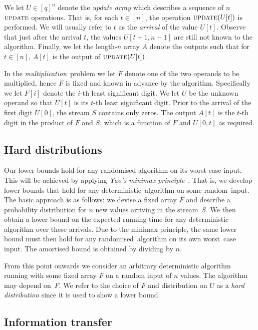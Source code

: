 \documentclass[11pt]{article}
\numberwithin{equation}{section}
\theoremstyle{definition}
\theoremstyle{plain}
\newcommand{\arrive}{\ensuremath{\textsc{update}}}
\begin{document}
We let $U\in [q]^n$ denote the \emph{update array} which describes a sequence of  $n$ $\arrive$ operations. That is, for each $t\in[n]$, the operation $\arrive(U[t])$ is performed.
We will usually refer to $t$ as the \emph{arrival} of the value $U[t]$.
Observe that just after the arrival $t$, the values $U[t+1,n-1]$ are still not known to the algorithm. Finally, we let the
%
length-$n$   %
array $A$ denote the outputs such that for $t\in [n]$, $A[t]$ is the output of $\arrive(U[t])$.

In the \emph{multiplication}~problem we let $F$ denote one of the two operands to be multiplied, hence $F$ is fixed and known in advance by the algorithm.
Specifically we let $F[i]$ denote the $i$-th least significant digit. We let $U$ be the unknown operand so that $U[t]$ is its $t$-th least significant digit. Prior to the arrival of the first digit $U[0]$, the stream $S$ contains only zeros. The output $A[t]$ is the $t$-th digit in the product of $F$ and $S$, which is a function of $F$ and $U[0,t]$ as required.

%

\subsection{Hard distributions}

Our lower bounds hold for any randomised algorithm on its worst case
input. This will be achieved by applying \emph{Yao's
	minimax principle}~\cite{Yao1977:Minimax}. That is, we develop
lower bounds that
hold for any deterministic~algorithm on some random~input. The basic approach is as follows: we devise a fixed array $F$ and describe a probability
distribution for $n$ new values arriving in the stream~$S$.
We then obtain a lower bound on the expected
running time for any deterministic algorithm over these arrivals.
Due to the minimax principle, the
same lower bound must then hold for any randomised~algorithm on its own
worst~case input. The amortised bound is obtained by dividing by $n$.

{}From this point onwards we consider an arbitrary deterministic algorithm
running with some fixed array $F$ on a random input of $n$ values. The algorithm may depend on~$F$. We refer to the choice of $F$ and distribution on $U$ as a \emph{hard distribution} since it is used to show a lower bound.

%
%




\subsection{Information transfer} \label{sec:more-notation}
\end{document}
